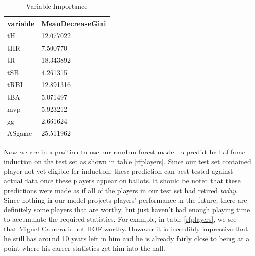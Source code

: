 \documentclass[preprint,12pt]{elsarticle}
\begin{document}
\begin{table}[h]
\centering
\begin{tabular}{|l |l|}
\hline
 variable & MeanDecreaseGini\\
\hline
tH     & 12.077022 \\
tHR    &  7.500770 \\
tR     & 18.343892 \\
tSB    &  4.261315 \\
tRBI   & 12.891316 \\
tBA    &  5.071497 \\
mvp    &  5.923212 \\
gg     &  2.661624 \\
ASgame & 25.511962 \\
\hline
\end{tabular}
\caption{Variable Importance}
\label{varImp}
\end{table}

Now we are in a position to use our random forest model to predict hall of fame induction on the test set as shown in table \ref{rfplayers}. Since our test set contained player not yet eligible for induction, these prediction can best tested against actual data once these players appear on ballots. It should be noted that these predictions were made as if all of the players in our test set had retired \textit{today}. Since nothing in our model projects players' performance in the future, there are definitely some players that are worthy, but just haven't had enough playing time to accumulate the required statistics. For example, in table \ref{rfplayers}, we see that Miguel Cabrera is not HOF worthy. However it is incredibly impressive that he still has around 10 years left in him and he is already fairly close to being at a point where his career statistics get him into the hall.
\end{document}

